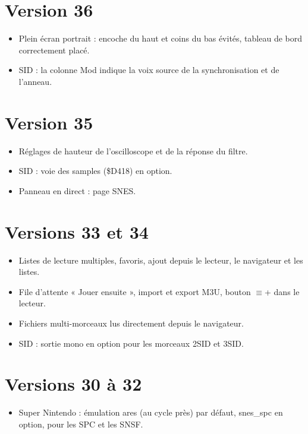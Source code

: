 \section*{Version 36}
\begin{itemize}
  \item Plein écran portrait : encoche du haut et coins du bas évités, tableau de bord correctement placé.
  \item SID : la colonne Mod indique la voix source de la synchronisation et de l'anneau.
\end{itemize}
\section*{Version 35}
\begin{itemize}
  \item Réglages de hauteur de l'oscilloscope et de la réponse du filtre.
  \item SID : voie des samples (\$D418) en option.
  \item Panneau en direct : page SNES.
\end{itemize}
\section*{Versions 33 et 34}
\begin{itemize}
  \item Listes de lecture multiples, favoris, ajout depuis le lecteur, le navigateur et les listes.
  \item File d'attente « Jouer ensuite », import et export M3U, bouton $\equiv$+ dans le lecteur.
  \item Fichiers multi-morceaux lus directement depuis le navigateur.
  \item SID : sortie mono en option pour les morceaux 2SID et 3SID.
\end{itemize}
\section*{Versions 30 à 32}
\begin{itemize}
  \item Super Nintendo : émulation ares (au cycle près) par défaut, snes\_spc en option, pour les SPC et les SNSF.
\end{itemize}
